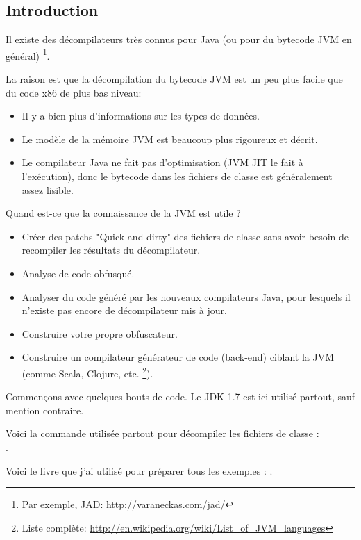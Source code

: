 \subsection{Introduction}

\newcommand{\JADURL}{\url{http://varaneckas.com/jad/}}

Il existe des décompilateurs très connus pour Java (ou pour du bytecode \ac{JVM} en général)
\footnote{Par exemple, JAD: \JADURL}.

La raison est que la décompilation du bytecode \ac{JVM} est un peu plus facile
que du code x86 de plus bas niveau:

\begin{itemize}
\item Il y a bien plus d'informations sur les types de données.
\item Le modèle de la mémoire \ac{JVM} est beaucoup plus rigoureux et décrit.
\item Le compilateur Java ne fait pas d'optimisation (\ac{JVM} \ac{JIT} le fait à l'exécution),
      donc le bytecode dans les fichiers de classe est généralement assez lisible.
      
\end{itemize}

Quand est-ce que la connaissance de la \ac{JVM} est utile ?

\newcommand{\URLListOfJVMLangs}{\url{http://en.wikipedia.org/wiki/List_of_JVM_languages}}

\begin{itemize}
\item Créer des patchs "Quick-and-dirty" des fichiers de classe sans avoir besoin de recompiler les résultats du décompilateur.
\item Analyse de code obfusqué.
\item Analyser du code généré par les nouveaux compilateurs Java, pour lesquels
      il n'existe pas encore de décompilateur mis à jour.
\item Construire votre propre obfuscateur.
\item Construire un compilateur générateur de code (back-end) ciblant la \ac{JVM} (comme Scala, Clojure, etc.
      \footnote{Liste complète: \URLListOfJVMLangs}).
      
\end{itemize}

Commençons avec quelques bouts de code.
Le JDK 1.7 est ici utilisé partout, sauf mention contraire.

Voici la commande utilisée partout pour décompiler les fichiers de classe :\\
.

Voici le livre que j'ai utilisé pour préparer tous les exemples : \JavaBook.

